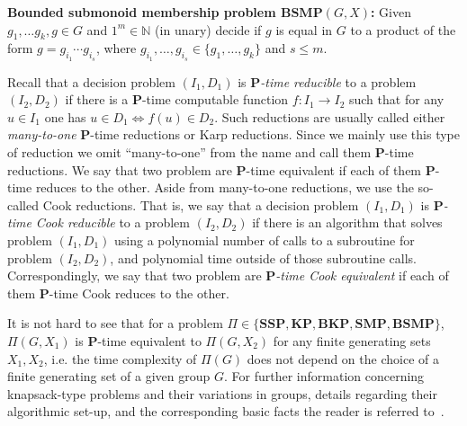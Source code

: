 \documentclass[10pt]{amsart}
\theoremstyle{definition}
\def\P{{\mathbf{P}}}
\def\SSP{{\mathbf{SSP}}}
\def\SMP{{\mathbf{SMP}}}
\def\BSMP{{\mathbf{BSMP}}}
\def\BKP{{\mathbf{BKP}}}
\def\KP{{\mathbf{KP}}}
\begin{document}
\medskip \noindent
{\bf Bounded submonoid membership problem $\BSMP(G,X)$\index{$\BSMP(G,X)$}:}
Given $g_1, \ldots g_k, g \in G$ and $1^m \in \mathbb{N}$ (in unary)
decide if $g$ is equal in $G$ to a product of the form
$g=g_{i_1}\cdots g_{i_s}$, where $g_{i_1}, \ldots, g_{i_s} \in \{g_1, \ldots, g_k\}$ and  $s\le m$.




\medskip
Recall that a decision problem $(I_1,D_1)$ is  {\em $\P$-time  reducible}
to  a problem $(I_2,D_2)$ if there is a $\P$-time computable function
$f:I_1  \to I_2$  such that for any $u \in I_1$ one has $u \in D_1 \Longleftrightarrow f(u) \in D_2$.
Such reductions are usually called either {\em many-to-one} $\P$-time reductions or Karp reductions.
Since we mainly use this type of reduction we omit ``many-to-one'' from the name and call them $\P$-time reductions. We say that two problem are $\P$-time equivalent if each of them $\P$-time reduces to the other. Aside from many-to-one reductions, we use the so-called Cook reductions. That is, we say that a decision problem $(I_1,D_1)$ is  {\em $\P$-time Cook  reducible} to  a problem $(I_2,D_2)$ if there is an algorithm that solves problem $(I_1,D_1)$ using a polynomial number of calls to a subroutine for problem $(I_2,D_2)$, and polynomial time outside of those subroutine calls. Correspondingly, we say that two problem are {\em $\P$-time Cook equivalent} if each of them $\P$-time Cook reduces to the other.

It is not hard to see that for a problem $\Pi\in \{\SSP, \KP, \BKP, \SMP, \BSMP\}$, $\Pi(G,X_1)$ is $\P$-time equivalent to $\Pi(G,X_2)$ for any finite generating sets $X_1,X_2$, i.e. the time complexity of $\Pi(G)$ does not depend on the choice of a finite generating set of a given group $G$.
For further information concerning knapsack-type problems and their variations in groups, details regarding their algorithmic set-up, and the corresponding basic facts the reader is referred to~\cite{Miasnikov-Nikolaev-Ushakov:2014a}.
\end{document}
